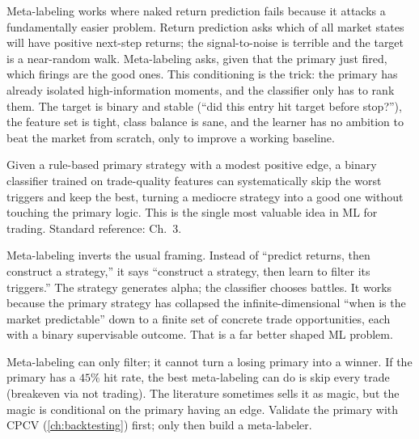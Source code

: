 Meta-labeling works where naked return prediction fails because
it attacks a fundamentally easier problem. Return prediction asks
which of all market states will have positive next-step returns;
the signal-to-noise is terrible and the target is a
near-random walk. Meta-labeling asks, given that the primary just
fired, which firings are the good ones. This conditioning is the
trick: the primary has already isolated high-information moments,
and the classifier only has to rank them. The target is binary and
stable (``did this entry hit target before stop?''), the feature
set is tight, class balance is sane, and the learner has no
ambition to beat the market from scratch, only to improve a
working baseline.

\begin{keyfactbox}
Given a rule-based primary strategy with a modest positive
edge, a binary classifier trained on trade-quality features
can systematically skip the worst triggers and keep the best,
turning a mediocre strategy into a good one without touching
the primary logic. This is the single most valuable idea
in ML for trading. Standard reference: \citeAFML{} Ch.~3.
\end{keyfactbox}

\begin{intuitionbox}
Meta-labeling inverts the usual framing. Instead of ``predict
returns, then construct a strategy,'' it says ``construct a
strategy, then learn to filter its triggers.'' The strategy
generates alpha; the classifier chooses battles. It works
because the primary strategy has collapsed the
infinite-dimensional ``when is the market predictable'' down to
a finite set of concrete trade opportunities, each with a
binary supervisable outcome. That is a far better shaped ML
problem.
\end{intuitionbox}

\begin{pitfallbox}
Meta-labeling can only filter; it cannot turn a losing primary
into a winner. If the primary has a $45\%$ hit rate, the best
meta-labeling can do is skip every trade (breakeven via not
trading). The literature sometimes sells it as magic, but the
magic is conditional on the primary having an edge. Validate the
primary with CPCV (\cref{ch:backtesting}) first; only then build
a meta-labeler.
\end{pitfallbox}

